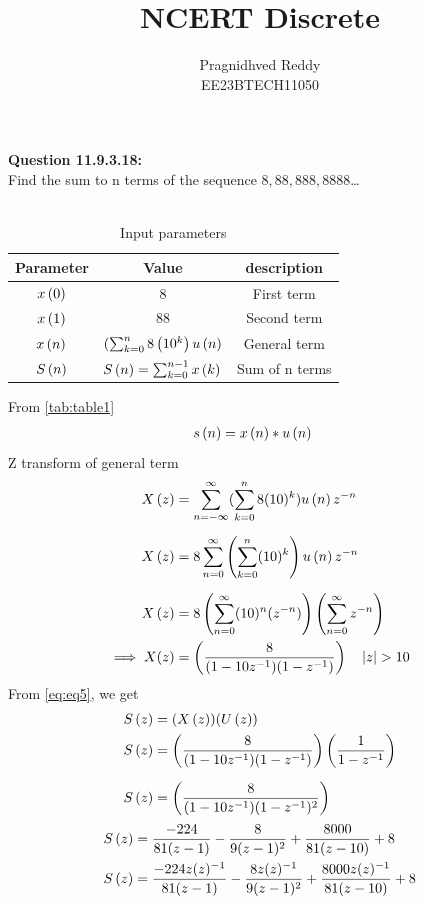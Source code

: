 \documentclass[journal,12pt,twocolumn]{IEEEtran}
\title{NCERT Discrete}
\author{Pragnidhved Reddy\\EE23BTECH11050}
\date{}
\begin{document}
\maketitle
\newpage
\bigskip
\textbf{Question 11.9.3.18:}\\
 Find the sum to n terms of the sequence $8,88,888,8888$\ldots\\
 \solution \\
 \begin{table}[H]
\centering
\setlength{\extrarowheight}{8pt}
\begin{tabular}{|c|c|c|}\hline
\textbf{Parameter} & \textbf{Value} & \textbf{description}\\ \hline
$x\left(0\right)$ & 8 & First term \\ \hline
$x\left(1\right)$ & 88 & Second term \\ \hline 
$x\left(n\right)$ & $(\sum^{n}_{k=0}8\left(10^k\right)u\left(n\right)$ & General term \\ \hline
$S\left(n\right)$ & $S\left(n\right)=\sum^{n-1}_{k=0}x\left(k\right)$ & Sum of n terms \\ \hline
\end{tabular}
\caption{Input parameters}
\label{tab:table1}
\end{table}
 From \eqref{tab:table1}
\begin{align}
\label{eq:eq5}
 s\left(n\right)&=x\left(n\right)* u\left(n\right)
 \end{align}
 Z transform of general term
 \begin{align}
 X\left(z\right)&=\sum_{n=-\infty}^{\infty}(\sum_{k=0}^{n}8(10)^k)u\left(n\right)z^{-n}\\[6pt]
 X\left(z\right)&=8\sum_{n=0}^{\infty}\left(\sum_{k=0}^{n}(10)^k\right)u\left(n\right)z^{-n}\\[6pt]
 X\left(z\right)&=8\left(\sum_{n=0}^{\infty}(10)^n(z^{-n})\right)\left(\sum_{n=0}^{\infty}z^{-n}\right)\\
 \implies X(z)&=\left(\frac{8}{(1-10z^{-1})(1-z^{-1})}\right) \quad \left\vert z\right\vert>10
\end{align}
From \eqref{eq:eq5}, we get
 \begin{align}
 S\left(z\right)&=(X\left(z\right))(U\left(z\right))\\
 S\left(z\right)&=\left(\frac{8}{(1-10z^{-1})(1-z^{-1})}\right)\left(\frac{1}{1-z^{-1}}\right)\\[6pt]
 S\left(z\right)&=\left(\frac{8}{(1-10z^{-1})(1-z^{-1})^2}\right)
\end{align}
\begin{align}
 S\left(z\right)&=\frac{-224}{81(z-1)}-\frac{8}{9(z-1)^2}+\frac{8000}{81(z-10)}+8\\
S\left(z\right)&=\frac{-224z(z)^{-1}}{81(z-1)}-\frac{8z(z)^{-1}}{9(z-1)^2}+\frac{8000z(z)^{-1}}{81(z-10)}+8
 \end{align}
\end{document}
